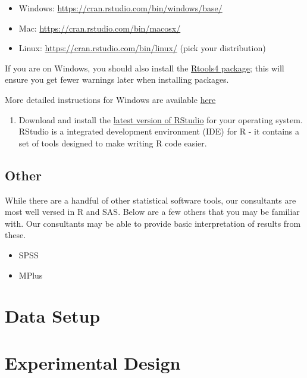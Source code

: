 \documentclass[
]{book}
\providecommand{\tightlist}{%
  \setlength{\itemsep}{0pt}\setlength{\parskip}{0pt}}
\begin{document}
\begin{itemize}
\tightlist
\item
  Windows: \url{https://cran.rstudio.com/bin/windows/base/}
\item
  Mac: \url{https://cran.rstudio.com/bin/macosx/}
\item
  Linux: \url{https://cran.rstudio.com/bin/linux/} (pick your distribution)
\end{itemize}

If you are on Windows, you should also install the \href{https://cran.rstudio.com/bin/windows/Rtools/}{Rtools4 package}; this will ensure you get fewer warnings later when installing packages.

More detailed instructions for Windows are available \href{https://owi.usgs.gov/R/training-curriculum/installr/index.html}{here}

\begin{enumerate}
\def\labelenumi{\arabic{enumi}.}
\setcounter{enumi}{1}
\tightlist
\item
  Download and install the \href{https://www.rstudio.com/products/rstudio/download/\#download}{latest version of RStudio} for your operating system. RStudio is a integrated development environment (IDE) for R - it contains a set of tools designed to make writing R code easier.
\end{enumerate}

\hypertarget{other}{%
\section{Other}\label{other}}

While there are a handful of other statistical software tools, our consultants are most well versed in R and SAS. Below are a few others that you may be familiar with. Our consultants may be able to provide basic interpretation of results from these.

\begin{itemize}
\tightlist
\item
  SPSS
\item
  MPlus
\end{itemize}

\hypertarget{data-setup}{%
\chapter{Data Setup}\label{data-setup}}

\hypertarget{experimental-design}{%
\chapter{Experimental Design}\label{experimental-design}}
\end{document}

